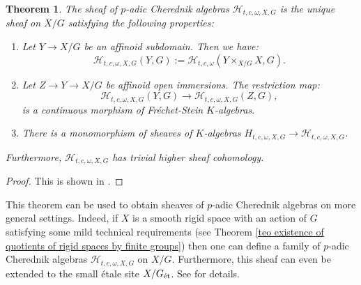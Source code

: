 \documentclass{amsart}
\newtheorem{teo}[defi]{ Theorem}
\begin{document}
\begin{teo}
The sheaf of $p$-adic Cherednik algebras $\mathcal{H}_{t,c,\omega,X,G}$  is the unique sheaf on $X/G$ satisfying the following properties:
\begin{enumerate}[label=(\roman*)]
    \item Let $Y\rightarrow X/G$ be an affinoid subdomain. Then we have:
\begin{equation*}
    \mathcal{H}_{t,c,\omega,X,G}(Y,G):= \mathcal{H}_{t,c,\omega}(Y\times_{X/G}X,G).    
\end{equation*}
\item Let $Z\rightarrow Y\rightarrow X/G$ be affinoid open immersions. The restriction map:
\begin{equation*}
    \mathcal{H}_{t,c,\omega,X,G}(Y,G)\rightarrow \mathcal{H}_{t,c,\omega,X,G}(Z,G),
\end{equation*}
is a continuous morphism of Fréchet-Stein $K$-algebras.
\item There is a monomorphism of sheaves of $K$-algebras $H_{t,c,\omega,X,G}\rightarrow \mathcal{H}_{t,c,\omega,X,G}$.
\end{enumerate}
Furthermore, $\mathcal{H}_{t,c,\omega,X,G}$ has trivial higher sheaf cohomology.
\end{teo}
\begin{proof}
This is shown in \cite[Theorem B]{p-adicCheralg}.
\end{proof}
This theorem can be used to obtain sheaves of $p$-adic Cherednik algebras on more general settings. Indeed, if $X$ is a smooth rigid space with an action of $G$ satisfying some mild technical requirements (see Theorem \ref{teo existence of quotients of rigid spaces by finite groups}) then one can define a family of $p$-adic Cherednik algebras $\mathcal{H}_{t,c,\omega,X,G}$ on  $X/G$. Furthermore, this sheaf can even be extended to the small étale site  $X/G_{\textnormal{ét}}$. See \cite[Section 4.5]{p-adicCheralg} for details.\bigskip
\end{document}
